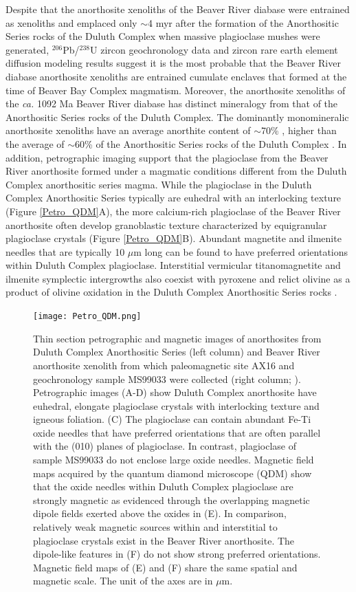 \documentclass[draft]{agujournal2019}
\begin{document}
Despite that the anorthosite xenoliths of the Beaver River diabase were entrained as xenoliths and emplaced only $\sim$4 myr after the formation of the Anorthositic Series rocks of the Duluth Complex when massive plagioclase mushes were generated, $^{206}$Pb/$^{238}$U zircon geochronology data and zircon rare earth element diffusion modeling results suggest it is the most probable that the Beaver River diabase anorthosite xenoliths are entrained cumulate enclaves that formed at the time of Beaver Bay Complex magmatism. Moreover, the anorthosite xenoliths of the \textit{ca.} 1092 Ma Beaver River diabase has distinct mineralogy from that of the Anorthositic Series rocks of the Duluth Complex. The dominantly monomineralic anorthosite xenoliths have an average anorthite content of $\sim$70\% \cite{Morrison1983a, Doyle2016a}, higher than the average of $\sim$60\% of the Anorthositic Series rocks of the Duluth Complex \cite{Miller1990a}. In addition, petrographic imaging support that the plagioclase from the Beaver River anorthosite formed under a magmatic conditions different from the Duluth Complex anorthositic series magma. While the plagioclase in the Duluth Complex Anorthositic Series typically are euhedral with an interlocking texture (Figure \ref{Petro_QDM}A), the more calcium-rich plagioclase of the Beaver River anorthosite often develop granoblastic texture characterized by equigranular plagioclase crystals (Figure \ref{Petro_QDM}B). Abundant magnetite and ilmenite needles that are typically 10 $\mu$m long can be found to have preferred orientations within Duluth Complex plagioclase. Interstitial vermicular titanomagnetite and ilmenite symplectic intergrowths also coexist with pyroxene and relict olivine as a product of olivine oxidation in the Duluth Complex Anorthositic Series rocks \cite{Miller1990a}. 

\begin{figure}
\noindent\texttt{[image: Petro\_QDM.png]}
\caption{\footnotesize{Thin section petrographic and magnetic images of anorthosites from Duluth Complex Anorthositic Series (left column) and Beaver River anorthosite xenolith from which paleomagnetic site AX16 and geochronology sample MS99033 were collected (right column; ). Petrographic images (A-D) show Duluth Complex anorthosite have euhedral, elongate plagioclase crystals with interlocking texture and igneous foliation. (C) The plagioclase can contain abundant Fe-Ti oxide needles that have preferred orientations that are often parallel with the (010) planes of plagioclase. In contrast, plagioclase of sample MS99033 do not enclose large oxide needles. Magnetic field maps acquired by the quantum diamond microscope (QDM) show that the oxide needles within Duluth Complex plagioclase are strongly magnetic as evidenced through the overlapping magnetic dipole fields exerted above the oxides in (E). In comparison, relatively weak magnetic sources within and interstitial to plagioclase crystals exist in the Beaver River anorthosite. The dipole-like features in (F) do not show strong preferred orientations. Magnetic field maps of (E) and (F) share the same spatial and magnetic scale. The unit of the axes are in $\mu$m.}}
\label{fig:Petro_QDM}
\end{figure}
\end{document}
